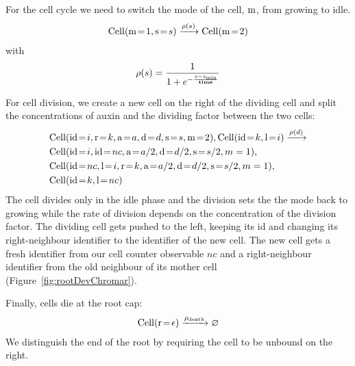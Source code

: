 For the cell cycle we need to switch the mode of the cell, $\mathrm{m}$, from
growing to idle.
\begin{align*}
  \mathrm{Cell}(\mathrm{m} \! = \! {1}, \mathrm{s} \! = \! {s}) \xrightarrow{\rho(s)} \mathrm{Cell}(\mathrm{m} \! = \! {2})
  \end{align*}
  with
  \begin{equation*}
\rho(s) = \frac{1}{1 + e^{- \frac{s-s_{\mathrm{min}}}{\mathbf{time}}}}
\end{equation*}

For cell division, we create a new cell on the right of the dividing cell and
split the concentrations of auxin and the dividing factor between the two cells:
\begin{align*}
  &\mr{Cell}(\ar{id}{i}, \ar{r}{k}, \ar{a}{a}, \ar{d}{d}, \ar{s}{s}, \ar{m}{2}),
  \mr{Cell}(\ar{id}{k}, \ar{l}{i}) \xrightarrow{\rho(d)} \\
  & \mr{Cell}(\ar{id}{i}, \ar{id}{nc}, \ar{a}{a/2}, \ar{d}{d/2}, \ar{s}{s/2},
    m=1), \\
  &  \mr{Cell}(\ar{id}{nc}, \ar{l}{i}, \ar{r}{k}, \ar{a}{a/2}, \ar{d}{d/2}, \ar{s}{s/2},
    m=1), \\
  &  \mr{Cell}(\ar{id}{k}, \ar{l}{nc})
\end{align*}
The cell divides only in the idle phase and the division sets the the mode back
to growing while the rate of division depends on the concentration of the
division factor. The dividing cell gets pushed to the left, keeping its id and
changing its right-neighbour identifier to the identifier of the new cell. The
new cell gets a fresh identifier from our cell counter observable $nc$ and a
right-neighbour identifier from the old neighbour of its mother cell
(Figure~\ref{fig:rootDevChromar}).

Finally, cells die at the root cap:
\begin{align*}
\mathrm{Cell}(\mathrm{r} \! = \! {\epsilon}) \xrightarrow{\rho_{\mathrm{death}}} \varnothing
\end{align*}
We distinguish the end of the root by requiring the cell to be unbound on the
right.

